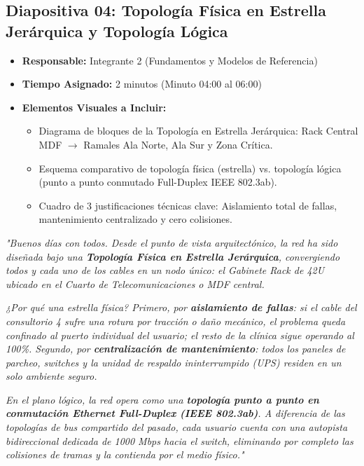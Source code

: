 \documentclass[11pt,a4paper]{article}
\begin{document}
\vspace{0.5cm}

\subsection{Diapositiva 04: Topología Física en Estrella Jerárquica y Topología Lógica}
\begin{itemize}[leftmargin=*]
    \item \textbf{Responsable:} Integrante 2 (Fundamentos y Modelos de Referencia)
    \item \textbf{Tiempo Asignado:} 2 minutos (Minuto 04:00 al 06:00)
    \item \textbf{Elementos Visuales a Incluir:}
    \begin{itemize}
        \item Diagrama de bloques de la Topología en Estrella Jerárquica: Rack Central MDF $\rightarrow$ Ramales Ala Norte, Ala Sur y Zona Crítica.
        \item Esquema comparativo de topología física (estrella) vs. topología lógica (punto a punto conmutado Full-Duplex IEEE 802.3ab).
        \item Cuadro de 3 justificaciones técnicas clave: Aislamiento total de fallas, mantenimiento centralizado y cero colisiones.
    \end{itemize}
\end{itemize}

\begin{tcolorbox}[colback=white,colframe=primaryblue,title=\textbf{Speech Verbal del Integrante 2 (Guion Palabra por Palabra)}]
\textit{"Buenos días con todos. Desde el punto de vista arquitectónico, la red ha sido diseñada bajo una \textbf{Topología Física en Estrella Jerárquica}, convergiendo todos y cada uno de los cables en un nodo único: el Gabinete Rack de 42U ubicado en el Cuarto de Telecomunicaciones o MDF central.}\par\vspace{2mm}
\textit{¿Por qué una estrella física? Primero, por \textbf{aislamiento de fallas}: si el cable del consultorio 4 sufre una rotura por tracción o daño mecánico, el problema queda confinado al puerto individual del usuario; el resto de la clínica sigue operando al 100\%. Segundo, por \textbf{centralización de mantenimiento}: todos los paneles de parcheo, switches y la unidad de respaldo ininterrumpido (UPS) residen en un solo ambiente seguro.}\par\vspace{2mm}
\textit{En el plano lógico, la red opera como una \textbf{topología punto a punto en conmutación Ethernet Full-Duplex (IEEE 802.3ab)}. A diferencia de las topologías de bus compartido del pasado, cada usuario cuenta con una autopista bidireccional dedicada de 1000 Mbps hacia el switch, eliminando por completo las colisiones de tramas y la contienda por el medio físico."}
\end{tcolorbox}
\end{document}
